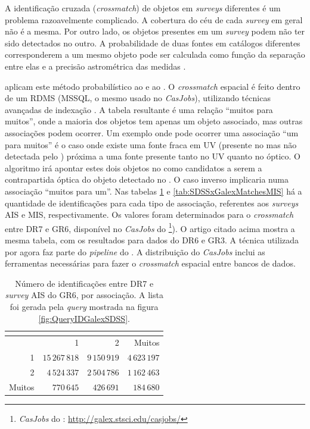 A identificação cruzada ({\em crossmatch}) de objetos em {\em surveys}
diferentes é um problema razoavelmente complicado. A cobertura do céu de cada
{\em survey} em geral não é a mesma. Por outro lado, os objetos presentes em um
{\em survey} podem não ter sido detectados no outro. A probabilidade de duas
fontes em catálogos diferentes corresponderem a um mesmo objeto pode ser
calculada como função da separação entre elas e a precisão astrométrica das
medidas \citep{Budavari2008}.

\citet{Budavari2009} aplicam este método probabilístico ao \SDSS e ao \galex. O
{\em crossmatch} espacial é feito dentro de um RDMS (MSSQL, o mesmo usado no
{\em CasJobs}), utilizando técnicas avançadas de indexação \citep[{\em
Hierarchic Triangular Mesh}]{Kunszt2000}. A tabela resultante é uma relação
``muitos para muitos'', onde a maioria dos objetos \galex tem apenas um objeto
\SDSS associado, mas outras associações podem ocorrer. Um exemplo onde pode
ocorrer uma associação ``um para muitos'' é o caso onde existe uma fonte fraca
em UV (presente no \SDSS mas não detectada pelo \galex) próxima a uma fonte
presente tanto no UV quanto no óptico. O algoritmo irá apontar estes dois
objetos no \SDSS como candidatos a serem a contrapartida óptica do objeto
detectado no \galex. O caso inverso implicaria numa associação ``muitos para
um''. Nas tabelas \ref{tab:SDSSxGalexMatchesAIS} e
\ref{tab:SDSSxGalexMatchesMIS} há a quantidade de identificações para cada tipo
de associação, referentes aos {\em surveys} AIS e MIS, respectivamente. Os
valores foram determinados para o {\em crossmatch} entre \SDSS DR7 e \galex GR6,
disponível no {\em CasJobs} do \galex\footnote{{\em CasJobs} do \galex:
\url{http://galex.stsci.edu/casjobs/}}). O artigo citado acima mostra a mesma
tabela, com os resultados para dados do \SDSS DR6 e \galex GR3. A técnica
utilizada por \citeauthor{Budavari2009} agora faz parte do {\em pipeline} do
\galex. A distribuição do {\em CasJobs} inclui as ferramentas necessárias para
fazer o {\em crossmatch} espacial entre bancos de dados.

\begin{table}
	\caption[Identificações entre \SDSS DR7 e {\em survey} AIS do \galex GR6.]
	{Número de identificações entre \SDSS DR7 e {\em survey} AIS do \galex GR6, por
	associação. A lista foi gerada pela {\em query} mostrada na figura
	\ref{fig:QueryIDGalexSDSS}.}
	\setlength{\tabcolsep}{1cm}
	\begin{tabular}{r r r r}
		\galex &          \multicolumn{3}{c}{\SDSS} \\
		\midrule
		       &              1 &             2 &        Muitos \\
		1      & $15\,267\,818$ & $9\,150\,919$ & $4\,623\,197$ \\
		2      &  $4\,524\,337$ & $2\,504\,786$ & $1\,162\,463$ \\
		Muitos &     $770\,645$ &    $426\,691$ &    $184\,680$ \\
	\end{tabular}
	\label{tab:SDSSxGalexMatchesAIS}
\end{table}

